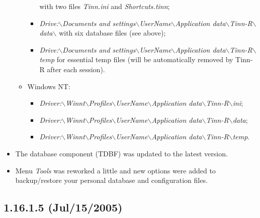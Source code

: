 \begin{itemize}
\begin{itemize}
\begin{footnotesize}
\begin{itemize}
              with two files \textit{Tinn.ini} and \textit{Shortcuts.tinn};
            \item \textit{Drive:$\backslash$Documents and settings$\backslash$UserName$\backslash$Application data$\backslash$Tinn-R$\backslash$data$\backslash$}
              with six database files (see above);
            \item \textit{Drive:$\backslash$Documents and settings$\backslash$UserName$\backslash$Application data$\backslash$Tinn-R$\backslash$temp} for essential temp files (will be automatically removed
              by Tinn-R after each session).
          \end{itemize}
        \end{footnotesize}
      \item Windows NT:
        \begin{footnotesize}
          \begin{itemize}
            \item \textit{Driver:$\backslash$Winnt$\backslash$Profiles$\backslash$UserName$\backslash$Application data$\backslash$Tinn-R$\backslash$ini};
            \item \textit{Driver:$\backslash$Winnt$\backslash$Profiles$\backslash$UserName$\backslash$Application data$\backslash$Tinn-R$\backslash$data};
            \item \textit{Driver:$\backslash$Winnt$\backslash$Profiles$\backslash$UserName$\backslash$Application data$\backslash$Tinn-R$\backslash$temp}.
          \end{itemize}
        \end{footnotesize}
    \end{itemize}
  \item The database component (TDBF) was updated to the latest version.
  \item Menu \textit{Tools} was reworked a little and new options were
    added to backup/restore your personal database and configuration files.
\end{itemize}


\subsection{1.16.1.5 (Jul/15/2005)}


